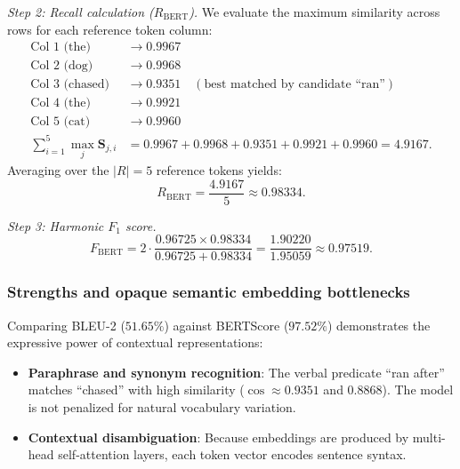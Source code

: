\documentclass[../../../main.tex]{subfiles}
\begin{document}
\textit{Step 2: Recall calculation ($R_{\text{BERT}}$).}
We evaluate the maximum similarity across rows for each reference token column:
\begin{align}
\text{Col 1 (the)}    &\to 0.9967 \nonumber \\
\text{Col 2 (dog)}    &\to 0.9968 \nonumber \\
\text{Col 3 (chased)} &\to 0.9351 \quad (\text{best matched by candidate ``ran''}) \nonumber \\
\text{Col 4 (the)}    &\to 0.9921 \nonumber \\
\text{Col 5 (cat)}    &\to 0.9960 \nonumber \\
\sum_{i=1}^5 \max_j \mathbf{S}_{j, i} &= 0.9967 + 0.9968 + 0.9351 + 0.9921 + 0.9960 = 4.9167.
\end{align}
Averaging over the $|R| = 5$ reference tokens yields:
\begin{equation}
R_{\text{BERT}} = \frac{4.9167}{5} \approx \mathbf{0.98334}.
\end{equation}

\textit{Step 3: Harmonic $F_1$ score.}
\begin{equation}
F_{\text{BERT}} = 2 \cdot \frac{0.96725 \times 0.98334}{0.96725 + 0.98334} = \frac{1.90220}{1.95059} \approx \mathbf{0.97519}.
\end{equation}

\subsubsection{Strengths and opaque semantic embedding bottlenecks}
Comparing BLEU-2 ($51.65\%$) against BERTScore ($97.52\%$) demonstrates the expressive power of contextual representations:
\begin{itemize}
    \item \textbf{Paraphrase and synonym recognition}: The verbal predicate ``ran after'' matches ``chased'' with high similarity ($\cos \approx 0.9351$ and $0.8868$). The model is not penalized for natural vocabulary variation.
    \item \textbf{Contextual disambiguation}: Because embeddings are produced by multi-head self-attention layers, each token vector encodes sentence syntax.
\end{itemize}
\end{document}
